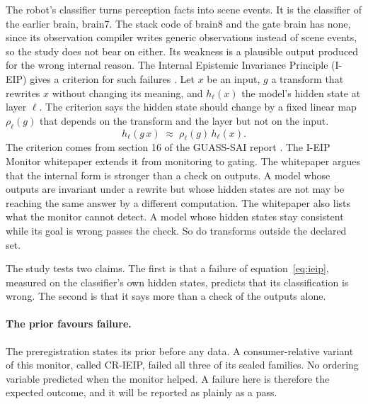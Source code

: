 The robot's classifier turns perception facts into scene events.
It is the classifier of the earlier brain, brain7.
The stack code of brain8 and the gate brain has none, since its observation compiler writes generic
observations instead of scene events, so the study does not bear on either.
Its weakness is a plausible output produced for the wrong internal reason.
The Internal Epistemic Invariance Principle (I-EIP) gives a criterion for such failures
\cite{bond2026ieip}.
Let $x$ be an input, $g$ a transform that rewrites $x$ without changing its meaning, and
$h_\ell(x)$ the model's hidden state at layer $\ell$.
The criterion says the hidden state should change by a fixed linear map $\rho_\ell(g)$ that
depends on the transform and the layer but not on the input.
\begin{equation}\label{eq:ieip}
  h_\ell(g\,x) \;\approx\; \rho_\ell(g)\, h_\ell(x).
\end{equation}
The criterion comes from section 16 of the GUASS-SAI report \cite{bond2025guass}.
The I-EIP Monitor whitepaper extends it from monitoring to gating.
The whitepaper argues that the internal form is stronger than a check on outputs.
A model whose outputs are invariant under a rewrite but whose hidden states are not may be
reaching the same answer by a different computation.
The whitepaper also lists what the monitor cannot detect.
A model whose hidden states stay consistent while its goal is wrong passes the check.
So do transforms outside the declared set.

The study tests two claims.
The first is that a failure of equation~\eqref{eq:ieip}, measured on the classifier's own hidden
states, predicts that its classification is wrong.
The second is that it says more than a check of the outputs alone.

\paragraph{The prior favours failure.}
The preregistration states its prior before any data.
A consumer-relative variant of this monitor, called CR-IEIP, failed all three of its sealed
families.
No ordering variable predicted when the monitor helped.
A failure here is therefore the expected outcome, and it will be reported as plainly as a pass.

